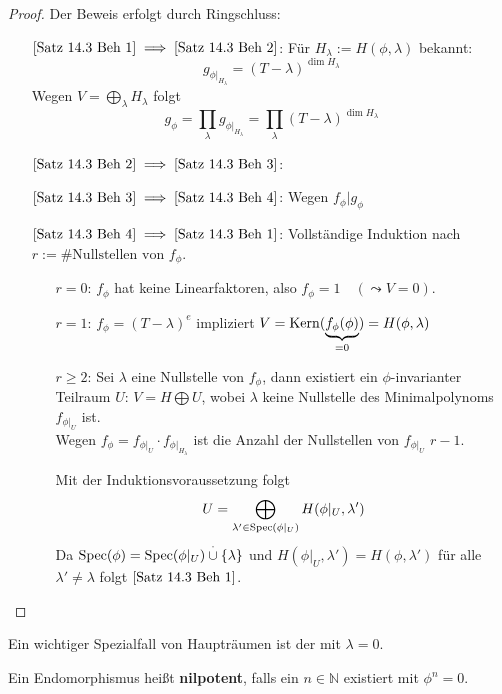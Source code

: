 \documentclass[parskip,a4paper,twoside,DIV15,BCOR12mm]{scrbook}
\begin{document}
\begin{proof}
Der Beweis erfolgt durch Ringschluss:
\begin{itemize}
\item[\(\eqref{Satz 14.3 Beh 1}\implies\eqref{Satz 14.3 Beh 2}\):] Für
\(H_{\lambda}:=H(\phi,\lambda)\) bekannt:
\[
g_{\phi|_{H_{\lambda}}}=(T-\lambda)^{\dim H_{\lambda}}
\]
Wegen \(V=\bigoplus_{\lambda}{H_{\lambda}}\) folgt
\[
g_{\phi}=\prod_{\lambda}{g_{\phi|_{H_{\lambda}}}}=
    \prod_{\lambda}{(T-\lambda)^{\dim H_{\lambda}}}
\]
\item[\(\eqref{Satz 14.3 Beh 2}\implies\eqref{Satz 14.3 Beh 3}\):]\checkmark
\item[\(\eqref{Satz 14.3 Beh 3}\implies\eqref{Satz 14.3 Beh 4}\):] Wegen
\(f_{\phi}\vert g_{\phi}\)\checkmark
\item[\(\eqref{Satz 14.3 Beh 4}\implies\eqref{Satz 14.3 Beh 1}\):] 
Vollständige Induktion nach \(r:=\#\text{Nullstellen von }f_{\phi}\).
\begin{itemize}
\item[\(r=0\):] \(f_{\phi}\) hat keine Linearfaktoren, also 
    \(f_{\phi}=1\quad(\leadsto V=0)\).
\item[\(r=1\):] \(f_{\phi}=(T-\lambda)^{e}\) impliziert 
\(V=\operatorname{Kern}(\underbrace{f_{\phi}(\phi)}_{=0})=H(\phi,\lambda)\)
\item[\(r\geq2\):] Sei \(\lambda\) eine Nullstelle von \(f_{\phi}\), dann
existiert ein \(\phi\)-invarianter Teilraum \(U:\,V=H\bigoplus U\), wobei
\(\lambda\) keine Nullstelle des Minimalpolynoms \(f_{\phi|_{U}}\) ist.\\
Wegen \(f_{\phi}=f_{\phi|_{U}}\cdot f_{\phi|_{H_{\lambda}}}\) ist die Anzahl der
Nullstellen von \(f_{\phi|_{U}}\) \(r-1\).

Mit der Induktionsvoraussetzung folgt
\[
U=\bigoplus_{\lambda'\in\operatorname{Spec}(\phi|_{U})}{H(\phi|_{U},\lambda')}
\]
Da \(\operatorname{Spec}(\phi)=\operatorname{Spec}(\phi|_{U})\overset{\cdot}{\cup}\{\lambda\}\) und 
\(H(\phi|_{U},\lambda')=H(\phi,\lambda')\) für alle \(\lambda'\neq\lambda\)
folgt \(\eqref{Satz 14.3 Beh 1}\).
\end{itemize}
\end{itemize}
\end{proof}
Ein wichtiger Spezialfall von Haupträumen ist der mit \(\lambda=0\).
\begin{definition}
Ein Endomorphismus heißt \textbf{nilpotent}, falls ein \(n\in\mathbb{N}\)
existiert mit \(\phi^{n}=0\).
\end{definition}
\begin{comment}[1]
Für nilpotentes \(\phi\) ist \(\Spec(\phi)=\{0\}\) und 
\(V=\Kern(\phi^{n})=H(\phi,0)\).
\end{comment}
\end{document}
